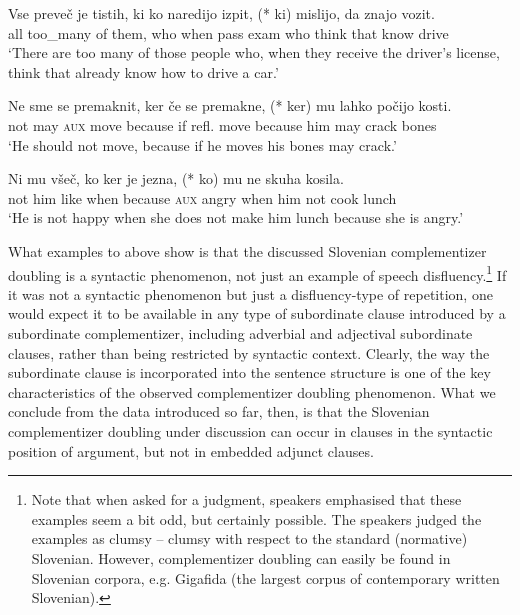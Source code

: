 \documentclass[output=paper,
]{langscibook}
\begin{document}
\begin{exe} 
\ex \label{ex:plesnicar:eleven}
\gll  Vse	preveč	je	tistih,	ki 	ko	naredijo	izpit,	(*\hspace{-2pt} ki) mislijo,	da	znajo	vozit.\\
	all	too\_many of them,	who	when	pass		exam	{} who think		that	know	drive\\
\trans `There are too many of those people who, when they receive the driver's license, think that already know how to drive a car.' %
\end{exe}
\begin{exe} 

\ex \label{ex:plesnicar:twelve}
\gll Ne	sme	se	premaknit,	ker		če	se	premakne, (*\hspace{-2pt} ker)		mu	lahko	počijo	kosti.\\
	not	may	\textsc{aux}	move	because	if	refl.	move {} because	him	may	crack	bones\\
\trans `He should not move, because if he moves his bones may crack.' 
\end{exe}


\begin{exe} 
\ex \label{ex:plesnicar:thirteen}
\gll Ni	mu	všeč,	ko	ker		je	jezna,	(*\hspace{-2pt} ko)	mu	ne	skuha kosila. \\
	not	him	like	when	because	\textsc{aux}	angry	{} when	him	not	cook lunch \\
\trans `He is not happy when she does not make him lunch because she is angry.' 
\end{exe}

\noindent What examples  to  above show is that the discussed Slovenian complementizer doubling is a syntactic phenomenon, not just an example of speech disfluency.\footnote{Note that when asked for a judgment, speakers emphasised that these examples seem a bit odd, but certainly possible. The speakers judged the examples as clumsy – clumsy with respect to the standard (normative) Slovenian. However, complementizer doubling can easily be found in Slovenian corpora, e.g. Gigafida (the largest corpus of contemporary written Slovenian).} If it was not a syntactic phenomenon but just a disfluency-type of repetition, one would expect it to be available in any type of subordinate clause introduced by a subordinate complementizer, including adverbial and adjectival subordinate clauses, rather than being restricted by syntactic context. Clearly, the way the subordinate clause is incorporated into the sentence structure is one of the key characteristics of the observed complementizer doubling phenomenon. What we conclude from the data introduced so far, then, is that the Slovenian complementizer doubling under discussion can occur in clauses in the syntactic position of argument, but not in embedded adjunct clauses.
\end{document}
